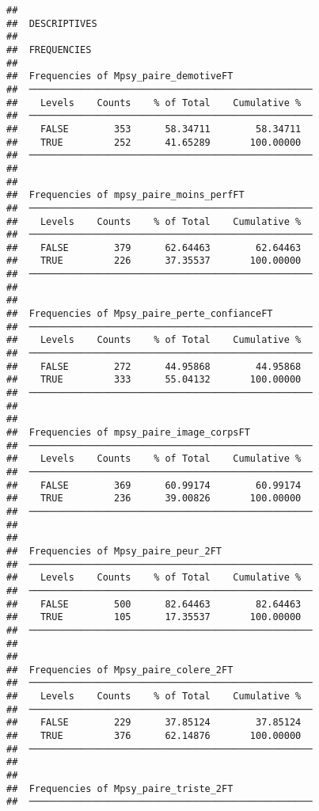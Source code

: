 \documentclass[
]{article}
\begin{document}
\begin{verbatim}
## 
##  DESCRIPTIVES
## 
##  FREQUENCIES
## 
##  Frequencies of Mpsy_paire_demotiveFT               
##  ────────────────────────────────────────────────── 
##    Levels    Counts    % of Total    Cumulative %   
##  ────────────────────────────────────────────────── 
##    FALSE        353      58.34711        58.34711   
##    TRUE         252      41.65289       100.00000   
##  ────────────────────────────────────────────────── 
## 
## 
##  Frequencies of mpsy_paire_moins_perfFT             
##  ────────────────────────────────────────────────── 
##    Levels    Counts    % of Total    Cumulative %   
##  ────────────────────────────────────────────────── 
##    FALSE        379      62.64463        62.64463   
##    TRUE         226      37.35537       100.00000   
##  ────────────────────────────────────────────────── 
## 
## 
##  Frequencies of Mpsy_paire_perte_confianceFT        
##  ────────────────────────────────────────────────── 
##    Levels    Counts    % of Total    Cumulative %   
##  ────────────────────────────────────────────────── 
##    FALSE        272      44.95868        44.95868   
##    TRUE         333      55.04132       100.00000   
##  ────────────────────────────────────────────────── 
## 
## 
##  Frequencies of mpsy_paire_image_corpsFT            
##  ────────────────────────────────────────────────── 
##    Levels    Counts    % of Total    Cumulative %   
##  ────────────────────────────────────────────────── 
##    FALSE        369      60.99174        60.99174   
##    TRUE         236      39.00826       100.00000   
##  ────────────────────────────────────────────────── 
## 
## 
##  Frequencies of Mpsy_paire_peur_2FT                 
##  ────────────────────────────────────────────────── 
##    Levels    Counts    % of Total    Cumulative %   
##  ────────────────────────────────────────────────── 
##    FALSE        500      82.64463        82.64463   
##    TRUE         105      17.35537       100.00000   
##  ────────────────────────────────────────────────── 
## 
## 
##  Frequencies of Mpsy_paire_colere_2FT               
##  ────────────────────────────────────────────────── 
##    Levels    Counts    % of Total    Cumulative %   
##  ────────────────────────────────────────────────── 
##    FALSE        229      37.85124        37.85124   
##    TRUE         376      62.14876       100.00000   
##  ────────────────────────────────────────────────── 
## 
## 
##  Frequencies of Mpsy_paire_triste_2FT               
##  ────────────────────────────────────────────────── 

\end{verbatim}
\end{document}
